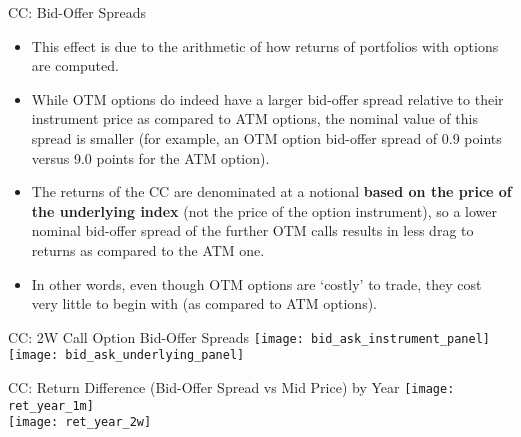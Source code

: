 \documentclass{beamer}
\begin{document}
\begin{frame}{CC: Bid-Offer Spreads}
\begin{itemize}
\item This effect is due to the arithmetic of how returns of portfolios with options are computed.
\vfill
\item While OTM options do indeed have a larger bid-offer spread relative to their instrument price as compared to ATM options, the nominal value of this spread is smaller (for example, an OTM option bid-offer spread of 0.9 points versus 9.0 points for the ATM option).
\vfill
\item The returns of the CC are denominated at a notional {\bf based on the price of the underlying index} (not the price of the option instrument), so a lower nominal bid-offer spread of the further OTM calls results in less drag to returns as compared to the ATM one.
\vfill
\item In other words, even though OTM options are `costly' to trade, they cost very little to begin with (as compared to ATM options).
\end{itemize}
\end{frame}

\begin{frame}{CC: 2W Call Option Bid-Offer Spreads}
\texttt{[image: bid\_ask\_instrument\_panel]} \\
\texttt{[image: bid\_ask\_underlying\_panel]}
\end{frame}

\begin{frame}{\normalsize CC: Return Difference (Bid-Offer Spread vs Mid Price) by Year}
\texttt{[image: ret\_year\_1m]} \\
\texttt{[image: ret\_year\_2w]}
\end{frame}
\end{document}
